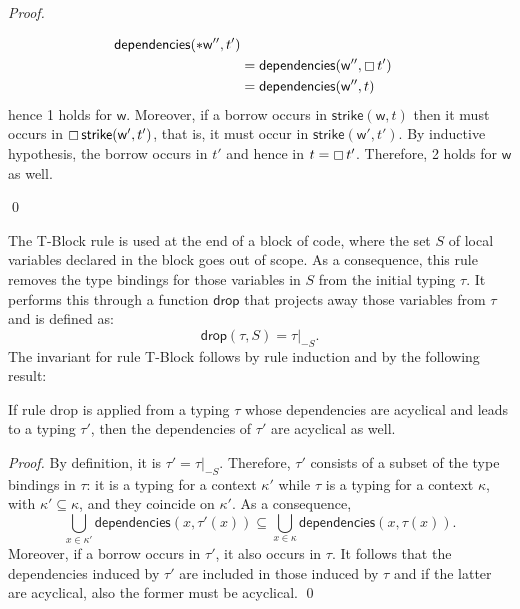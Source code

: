 \begin{proof}
\begin{itemize}
\begin{align*}
      \mathsf{dependencies}(\mathtt{*}\mathsf{w}'',t')\\
      &=\mathsf{dependencies}(\mathsf{w}'',\boxempty\,{t'})\\
      &=\mathsf{dependencies}(\mathsf{w}'',t)
    \end{align*}
    hence 1 holds for $\mathsf{w}$. Moreover, if a borrow occurs in
    $\mathsf{strike}(\mathsf{w},t)$ then it must occurs
    in $\boxempty\,{\mathsf{strike}(\mathsf{w}',t')}$, that is, it must occur in
    $\mathsf{strike}(\mathsf{w}',t')$. By inductive hypothesis, the borrow
    occurs in $t'$ and hence in $t=\boxempty\,{t'}$. Therefore, 2 holds for
    $\mathsf{w}$ as well.
  \end{itemize}
  \qed
\end{proof}

The \textsf{T-Block} rule is used at the end of a block of code, where the set $S$ of local
variables declared in the block goes out of scope. As a consequence, this rule removes
the type bindings for those variables in $S$ from the initial typing $\tau$. It performs this
through a function $\mathsf{drop}$ that projects away those variables from $\tau$ and is defined as:
\[
\mathsf{drop}(\tau,S)=\tau|_{-S}.
\]
The invariant for rule \textsf{T-Block} follows by rule induction and by the following result:
%
\begin{lemma}\label{lem:drop_invariant}
  If rule \textsf{drop} is applied from a typing $\tau$ whose dependencies
  are acyclical and leads to a typing $\tau'$, then the dependencies
  of $\tau'$ are acyclical as well.
\end{lemma}
\begin{proof}
  By definition, it is $\tau'=\tau|_{-S}$. Therefore, $\tau'$ consists of a subset of the
  type bindings in $\tau$: it is a typing for a context $\kappa'$ while $\tau$ is a
  typing for a context $\kappa$, with $\kappa'\subseteq\kappa$, and they coincide
  on $\kappa'$. As a consequence,
  \[
  \bigcup\limits_{x\in\kappa'}\mathsf{dependencies}(x,\tau'(x))\subseteq
  \bigcup\limits_{x\in\kappa}\mathsf{dependencies}(x,\tau(x)).
  \]
  Moreover, if a borrow occurs in $\tau'$, it also occurs in $\tau$. It follows
  that the dependencies induced by $\tau'$ are included in those induced by $\tau$
  and if the latter are acyclical, also the former must be acyclical.
  \qed
\end{proof}

